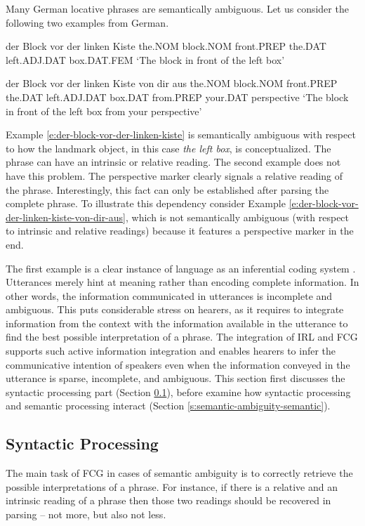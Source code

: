 Many German locative phrases are semantically ambiguous.
Let us consider the following two examples from German.
\begin{example}
\label{e:der-block-vor-der-linken-kiste}
\gll der Block vor der linken Kiste 
the.NOM block.NOM front.PREP the.DAT left.ADJ.DAT box.DAT.FEM 
\glt `The block in front of the left box'
\glend
\item
\label{e:der-block-vor-der-linken-kiste-von-dir-aus}
\gll der Block vor der linken Kiste von dir aus 
the.NOM block.NOM front.PREP the.DAT left.ADJ.DAT box.DAT from.PREP your.DAT perspective 
\glt `The block in front of the left box from your perspective'
\glend
\end{example}
Example \ref{e:der-block-vor-der-linken-kiste} is semantically ambiguous with 
respect to how the landmark object, in this case \emph{the left box}, is 
conceptualized. The phrase can have an intrinsic or relative reading.
The second example does not have this problem. 
The perspective marker clearly signals a relative reading of the phrase.
Interestingly, this fact can only be established after parsing the complete phrase. 
To illustrate this dependency consider Example  \ref{e:der-block-vor-der-linken-kiste-von-dir-aus}, 
which is not semantically ambiguous (with respect to intrinsic and relative readings)
because it features a perspective marker in the end. 


The first example is a clear instance of language as an inferential coding 
system \citep{sperber1986relevance}. Utterances merely hint at meaning 
rather than encoding complete information.
In other words, the information communicated in utterances is incomplete and
ambiguous. This puts considerable stress on hearers, as it requires 
to integrate information from the context with the information available in the
utterance to find the best possible interpretation of a phrase.
The integration of IRL and FCG supports such active information integration
and enables hearers to infer the communicative intention of speakers
even when the information conveyed in the utterance is sparse, incomplete,
and ambiguous. This section first discusses the syntactic processing part 
(Section \ref{s:semantic-ambiguity-syntactic}), before examine how 
syntactic processing and semantic processing 
interact (Section \ref{s:semantic-ambiguity-semantic}).


\subsection{Syntactic Processing}
\label{s:semantic-ambiguity-syntactic}
The main task of FCG in cases of semantic ambiguity is to correctly 
retrieve the possible interpretations of a phrase. For instance, if there
is a relative and an intrinsic reading of a phrase then those two 
readings should be recovered in parsing -- not more, but also not less.

